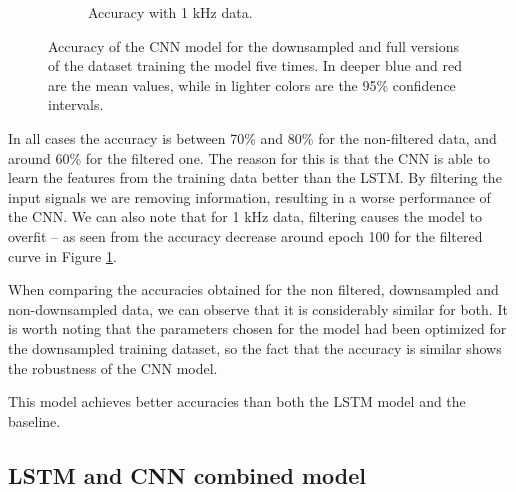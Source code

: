 \documentclass[10pt,conference,compsocconf]{IEEEtran}
\begin{document}
\begin{figure}[t]
\begin{subfigure}{0.5\textwidth}
            \caption{Accuracy with 1 kHz data.}
            \label{fig:cnn_500}
        \end{subfigure}
        \caption{Accuracy of the CNN model for the downsampled and full versions of the dataset training the model five times. In deeper blue and red are the mean values, while in lighter colors are the 95\% confidence intervals.}
        \label{fig:cnn_perf_optim}
    \end{figure}
    

    In all cases the accuracy is between 70\% and 80\% for the non-filtered data, and around 60\% for the filtered one. The reason for this is that the CNN is able to learn the features from the training data better than the LSTM. By filtering the input signals we are removing information, resulting in a worse performance of the CNN. We can also note that for 1 kHz data, filtering causes the model to overfit -- as seen from the accuracy decrease around epoch 100 for the filtered curve in Figure \ref{fig:cnn_500}.
    
    When comparing the accuracies obtained for the non filtered, downsampled and non-downsampled data, we can observe that it is considerably similar for both. It is worth noting that the parameters chosen for the model had been optimized for the downsampled training dataset, so the fact that the accuracy is similar shows the robustness of the CNN model.
    
    This model achieves better accuracies than both the LSTM model and the baseline.
    
    

    \subsection{LSTM and CNN combined model} %
    \label{ssec:CNN+LSTM}
    
\end{document}
